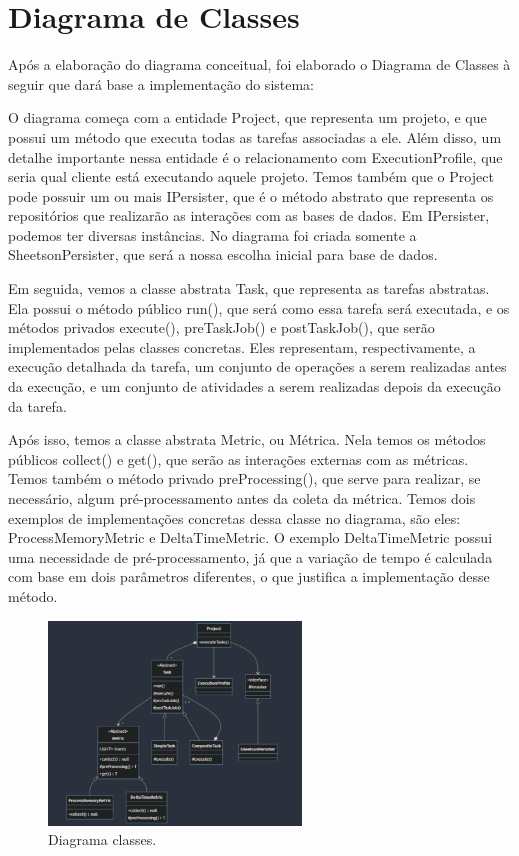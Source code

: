 \documentclass[12pt]{tcc}
\begin{document}
\section{Diagrama de Classes}

Após a elaboração do diagrama conceitual, foi elaborado o Diagrama de Classes à seguir que dará base a implementação do sistema: 

O diagrama começa com a entidade Project, que representa um projeto, e que possui um método que executa todas as tarefas associadas a ele.
Além disso, um detalhe importante nessa entidade é o relacionamento com ExecutionProfile, que seria qual cliente está executando aquele projeto. Temos também que o Project pode possuir um ou mais IPersister, que é o método abstrato que representa os repositórios que realizarão as interações com as bases de dados. Em IPersister, podemos ter diversas instâncias.
No diagrama foi criada somente a SheetsonPersister, que será a nossa escolha inicial para base de dados.

Em seguida, vemos a classe abstrata Task, que representa as tarefas abstratas.
Ela possui o método público run(), que será como essa tarefa será executada, e os métodos privados execute(), preTaskJob() e postTaskJob(), que serão implementados pelas classes concretas.
Eles representam, respectivamente, a execução detalhada da tarefa, um conjunto de operações a serem realizadas antes da execução, e um conjunto de atividades a serem realizadas depois da execução da tarefa.

Após isso, temos a classe abstrata Metric, ou Métrica.
Nela temos os métodos públicos collect() e get(), que serão as interações externas com as métricas.
Temos também o método privado preProcessing(), que serve para realizar, se necessário, algum pré-processamento antes da coleta da métrica.
Temos dois exemplos de implementações concretas dessa classe no diagrama, são eles:
ProcessMemoryMetric e DeltaTimeMetric. O exemplo DeltaTimeMetric possui uma necessidade de pré-processamento, já que a variação de tempo é calculada com base em dois parâmetros diferentes, o que justifica a implementação desse método.


\begin{figure}[!ht]
	\centering
	\includegraphics[width=0.6\textwidth]{figures/diagrama-classes.png}
	\caption{Diagrama classes.}
	\label{fig:diag-classes}
\end{figure}
\end{document}
